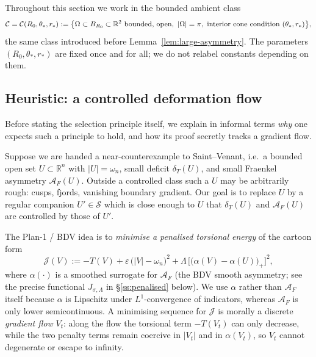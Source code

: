 \documentclass[11pt]{amsart}
\newcommand{\R}{\mathbb R}
\newcommand{\dT}{\delta_T}
\newcommand{\AF}{\mathcal A_F}
\newcommand{\eps}{\varepsilon}
\newcommand{\Sclass}{\mathcal S}
\begin{document}
Throughout this section we work in the bounded ambient class
\[
   \mathcal C=\mathcal C(R_0,\theta_*,r_*)
   :=\bigl\{\Omega\subset B_{R_0}\subset\R^2\hbox{ bounded, open},\
      |\Omega|=\pi,\ \hbox{interior cone condition }
         (\theta_*,r_*)\bigr\},
\]
the same class introduced before Lemma~\ref{lem:large-asymmetry}.  The
parameters \((R_0,\theta_*,r_*)\) are fixed once and for all; we do not
relabel constants depending on them.

\subsection{Heuristic: a controlled deformation flow}
\label{ss:flow-heuristic}

Before stating the selection principle itself, we explain in informal
terms \emph{why} one expects such a principle to hold, and how its
proof secretly tracks a gradient flow.

Suppose we are handed a near-counterexample to Saint--Venant, i.e.\ a
bounded open set $U\subset\R^n$ with $|U|=\omega_n$, small deficit
$\dT(U)$, and small Fraenkel asymmetry $\AF(U)$.  Outside a controlled
class such a $U$ may be arbitrarily rough: cusps, fjords, vanishing
boundary gradient.  Our goal is to replace $U$ by a regular companion
$U'\in\Sclass$ which is close enough to $U$ that $\dT(U)$ and
$\AF(U)$ are controlled by those of $U'$.

The Plan-1 / BDV idea is to \emph{minimise a penalised torsional
energy} of the cartoon form
\begin{equation}\label{eq:J-cartoon}
   \mathcal{J}(V):=-T(V)+\eps\,\bigl(|V|-\omega_n\bigr)^{2}
      +\Lambda\,\bigl[\bigl(\alpha(V)-\alpha(U)\bigr)_{+}\bigr]^{2},
\end{equation}
where $\alpha(\cdot)$ is a smoothed surrogate for $\AF$ (the BDV
smooth asymmetry; see the precise functional $J_{\sigma,\Lambda}$ in
\S\ref{ss:penalised} below).  We use $\alpha$ rather than $\AF$
itself because $\alpha$ is Lipschitz under $L^{1}$-convergence of
indicators, whereas $\AF$ is only lower semicontinuous.  A minimising
sequence for $\mathcal{J}$ is morally a discrete \emph{gradient flow}
$V_{t}$: along the flow the torsional term $-T(V_{t})$ can only
decrease, while the two penalty terms remain coercive in $|V_{t}|$
and in $\alpha(V_{t})$, so $V_{t}$ cannot degenerate or escape to
infinity.
\end{document}
